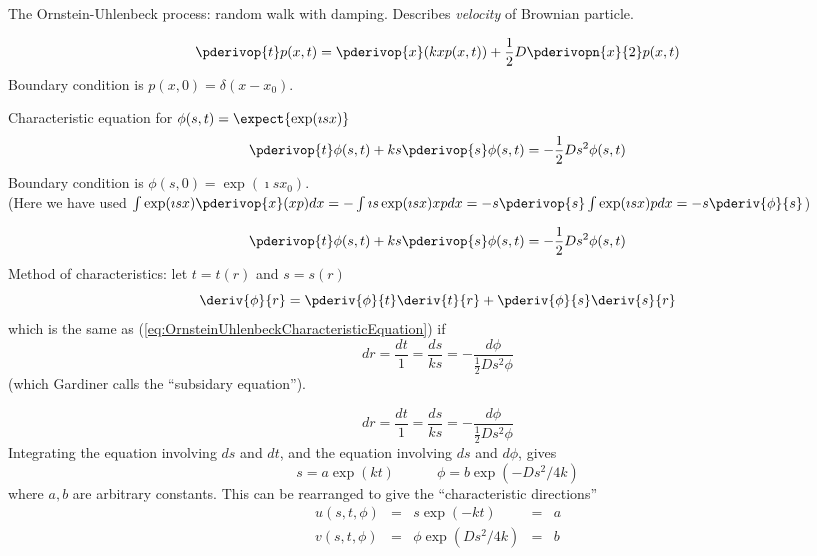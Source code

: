 \documentclass{beamer}
\begin{document}
\begin{frame}{}

The Ornstein-Uhlenbeck process: random walk with damping.
Describes {\em velocity} of Brownian particle. %

\[
\pderivop{t} p(x,t) = \pderivop{x} (kxp(x,t)) + \frac{1}{2} D \pderivopn{x}{2} p(x,t)
\]
Boundary condition is $p(x,0) = \delta(x-x_0)$.

Characteristic equation for $\phi(s,t) = \expect{\exp(\imath sx)}$
\begin{equation}
\pderivop{t} \phi(s,t) + ks\pderivop{s} \phi(s,t) = -\frac{1}{2} Ds^2 \phi(s,t)
\end{equation}
Boundary condition is $\phi(s,0) = \exp(\imath sx_0)$.
\\
(Here we have used $\int \exp(\imath sx) \pderivop{x} (xp) dx = -\int \imath s \exp(\imath sx) xp dx = -s \pderivop{s} \int \exp(\imath sx) pdx = -s \pderiv{\phi}{s}$)
\end{frame}
\begin{frame}{}
  
\begin{equation}
\label{eq:OrnsteinUhlenbeckCharacteristicEquation}
\pderivop{t} \phi(s,t) + ks\pderivop{s} \phi(s,t) = -\frac{1}{2} Ds^2 \phi(s,t)
\end{equation}
Method of characteristics: let $t=t(r)$ and $s=s(r)$
\[
\deriv{\phi}{r} = \pderiv{\phi}{t} \deriv{t}{r} + \pderiv{\phi}{s} \deriv{s}{r}
\]
which is the same as (\ref{eq:OrnsteinUhlenbeckCharacteristicEquation}) if
\[
dr = \frac{dt}{1} = \frac{ds}{ks} = -\frac{d\phi}{\frac{1}{2} Ds^2 \phi}
\]
(which Gardiner calls the ``subsidary equation'').
\end{frame}
\begin{frame}{}
\[
dr = \frac{dt}{1} = \frac{ds}{ks} = -\frac{d\phi}{\frac{1}{2} Ds^2 \phi}
\]
Integrating the equation involving $ds$ and $dt$, and the equation involving $ds$ and $d\phi$, gives
\[
s = a \exp(kt)
\quad\quad\quad
\phi = b \exp(-Ds^2/4k)
\]
where $a,b$ are arbitrary constants.
This can be rearranged to give the ``characteristic directions''
\[
\begin{array}{rllll}
u(s,t,\phi) & = & s\exp(-kt) & = & a \\
v(s,t,\phi) & = & \phi\exp(Ds^2/4k) & = & b
\end{array}
\]
\end{frame}
\end{document}

